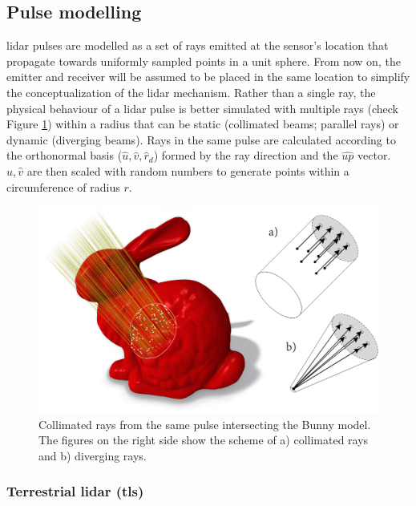 \subsection{Pulse modelling}

\acrshort{lidar} pulses are modelled as a set of rays emitted at the sensor's location that propagate towards uniformly sampled points in a unit sphere. From now on, the emitter and receiver will be assumed to be placed in the same location to simplify the conceptualization of the \acrshort{lidar} mechanism. Rather than a single ray, the physical behaviour of a \acrshort{lidar} pulse is better simulated with multiple rays \cite{zohdi_rapid_2020} (check Figure \ref{fig:pulse_radius_insight}) within a radius that can be static (collimated beams; parallel rays) or dynamic (diverging beams). Rays in the same pulse are calculated according to the orthonormal basis ($\hat{u}, \hat{v}, \hat{r}_{d}$) formed by the ray direction and the $\hat{\textit{up}}$ vector. $\hat{u}, \hat{v}$ are then scaled with random numbers to generate points within a circumference of radius $r$. 

\begin{figure}[ht]
	\centering
	\includegraphics[width=\linewidth]{figs/lidar_simulation/ray_section.png}
	\caption{Collimated rays from the same pulse intersecting the Bunny model. The figures on the right side show the scheme of a) collimated rays and b) diverging rays.}
	\label{fig:pulse_radius_insight}
\end{figure}

\subsubsection{Terrestrial \acrshort{lidar} (\acrshort{tls})}

